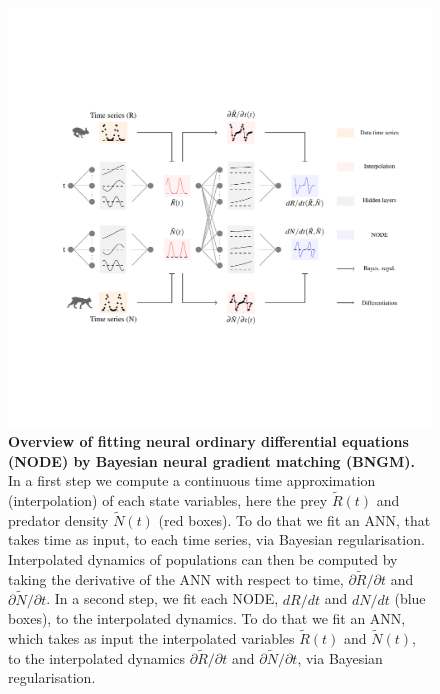 \documentclass[11pt, oneside]{article}
\begin{document}
\newpage
\begin{figure}[H]
\includegraphics[width=\linewidth,page=1]{figures/main.pdf}
\caption{
    \textbf{Overview of fitting neural ordinary differential equations (NODE) by Bayesian neural gradient matching (BNGM).}
    In a first step we compute a continuous time approximation (interpolation) of each state variables, here the prey $\tilde{R}(t)$ and predator density $\tilde{N}(t)$ (red boxes).
    To do that we fit an ANN, that takes time as input, to each time series, via Bayesian regularisation.
    Interpolated dynamics of populations can then be computed by taking the derivative of the ANN with respect to time, $\partial\tilde{R}/\partial t$ and $\partial\tilde{N}/\partial t$.
    In a second step, we fit each NODE, $dR/dt$ and $dN/dt$ (blue boxes), to the interpolated dynamics.
    To do that we fit an ANN, which takes as input the interpolated variables $\tilde{R}(t)$ and $\tilde{N}(t)$, to the interpolated dynamics $\partial\tilde{R}/\partial t$ and $\partial\tilde{N}/\partial t$, via Bayesian regularisation.
}
\end{figure}
\newpage
\end{document}
